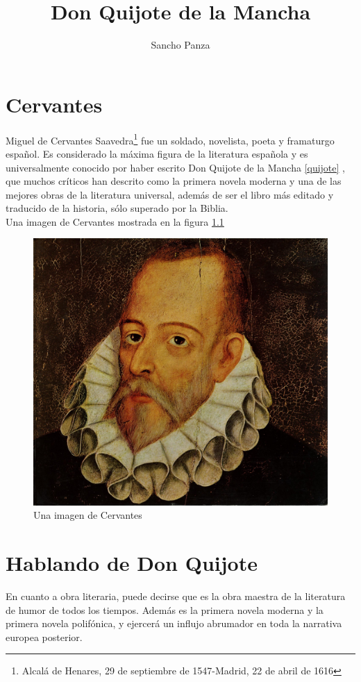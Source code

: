 \documentclass{book}
\title{Don Quijote de la Mancha}
\author{Sancho Panza}
\begin{document}
\maketitle

\chapter{Cervantes}
Miguel de Cervantes Saavedra\footnote{Alcal\'a de Henares, 29 de septiembre de 1547-Madrid, 22 de abril de 1616} fue un soldado, novelista, poeta y framaturgo espa\~nol.
Es considerado la m\'axima figura de la literatura espa\~nola y es universalmente conocido por haber escrito Don Quijote de la Mancha \ref{quijote} , que muchos cr\'iticos han descrito como la primera novela moderna y una de las mejores obras de la literatura universal, adem\'as de ser el libro m\'as editado y traducido de la historia, s\'olo superado por la Biblia.\\
\indent Una imagen de Cervantes mostrada en la figura \ref{cervantes}

\newpage
\begin{figure}[h]
\includegraphics[scale=.2]{figCervantes}
\centering
\caption{Una imagen de Cervantes}
\label{cervantes}
\end{figure}


\chapter{Hablando de Don Quijote}
En cuanto a obra literaria, puede decirse que es la obra maestra de la literatura de humor de todos los tiempos. Adem\'as es la primera novela moderna y la primera novela polif\'onica, y ejercer\'a un influjo abrumador en toda la narrativa europea posterior.
\end{document}
